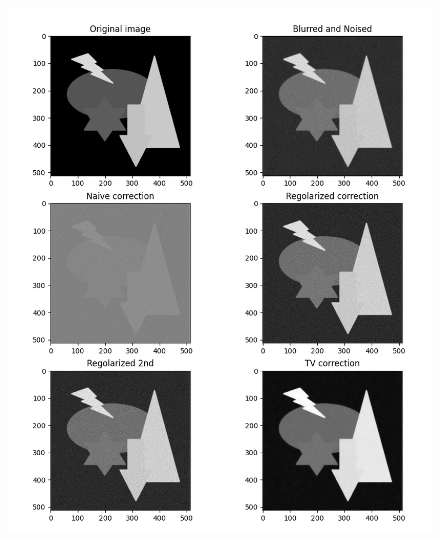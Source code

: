 \documentclass[12pt]{article}
\begin{document}
    \begin{figure}[h!]
    \centering
    \includegraphics[width=14cm]{sample7}
    \end{figure}
    \newpage
\end{document}
